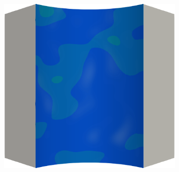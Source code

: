 \begin{frame}
\begin{columns}[T]
\begin{column}{0.6\textwidth}
\begin{figure}
{\begin{subfigure}{0.19\textwidth}
          \end{subfigure}
          \hspace{0.06\textwidth}
          \begin{subfigure}{0.19\textwidth}
            \centering
            \includegraphics[width=\textwidth]{Chapter345/figures/ep.0003}
          \end{subfigure}
        }
        

\end{figure}
\end{column}
\end{columns}
\end{frame}
